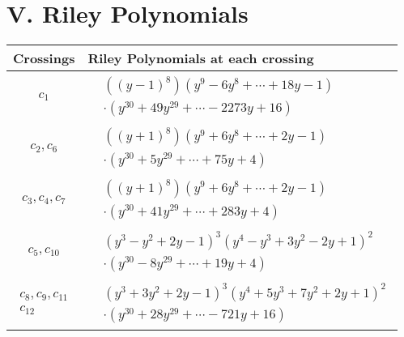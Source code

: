 \documentclass[1p]{elsarticle_modified}
\theoremstyle{definition}
\begin{document}
\centering \section*{ V. Riley Polynomials}
\begin{tabular}{m{50pt}|m{274pt}}
Crossings & \hspace{64pt}Riley Polynomials at each crossing \\
\hline $$\begin{aligned}c_{1}\end{aligned}$$&$\begin{aligned}
&((y-1)^8)(y^9-6 y^8+\cdots+18 y-1)\\
&\cdot(y^{30}+49 y^{29}+\cdots-2273 y+16)
\end{aligned}$\\
\hline $$\begin{aligned}c_{2},c_{6}\end{aligned}$$&$\begin{aligned}
&((y+1)^8)(y^9+6 y^8+\cdots+2 y-1)\\
&\cdot(y^{30}+5 y^{29}+\cdots+75 y+4)
\end{aligned}$\\
\hline $$\begin{aligned}c_{3},c_{4},c_{7}\end{aligned}$$&$\begin{aligned}
&((y+1)^8)(y^9+6 y^8+\cdots+2 y-1)\\
&\cdot(y^{30}+41 y^{29}+\cdots+283 y+4)
\end{aligned}$\\
\hline $$\begin{aligned}c_{5},c_{10}\end{aligned}$$&$\begin{aligned}
&(y^3- y^2+2 y-1)^3(y^4- y^3+3 y^2-2 y+1)^2\\
&\cdot(y^{30}-8 y^{29}+\cdots+19 y+4)
\end{aligned}$\\
\hline $$\begin{aligned}c_{8},c_{9},c_{11}\\c_{12}\end{aligned}$$&$\begin{aligned}
&(y^3+3 y^2+2 y-1)^3(y^4+5 y^3+7 y^2+2 y+1)^2\\
&\cdot(y^{30}+28 y^{29}+\cdots-721 y+16)
\end{aligned}$\\
\hline
\end{tabular}
\vskip 2pc
\end{document}
